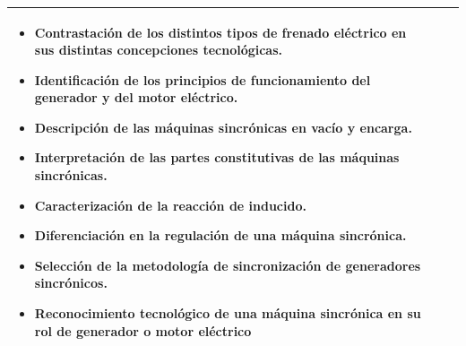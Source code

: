 \documentclass[../main]{subfiles}
\begin{document}
\begin{longtable}{|p{4cm}|p{4cm}|p{7cm}|}
\begin{itemize}
\item Contrastación de los distintos tipos de frenado eléctrico en sus distintas concepciones tecnológicas.
\item Identificación de los principios de funcionamiento del generador y del motor eléctrico.
\item Descripción de las máquinas sincrónicas en vacío y encarga.
\item Interpretación de las partes constitutivas de las máquinas sincrónicas.
\item Caracterización de la reacción de inducido.
\item Diferenciación en la regulación de una máquina sincrónica.
\item Selección de la metodología de sincronización de generadores sincrónicos.
\item Reconocimiento tecnológico de una máquina sincrónica en su rol de generador o motor eléctrico
\end{itemize}\\  \hline
\end{longtable}


\tableofcontents
\thispagestyle{empty}
\end{document}
